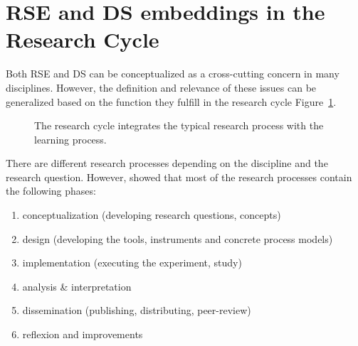 \documentclass[
        english,biblatex
    ]{lni}
\providecommand{\tightlist}{%
    \setlength{\itemsep}{0pt}\setlength{\parskip}{0pt}}
\begin{document}
    \section{RSE and DS embeddings in the Research
    Cycle}\label{rse-and-ds-embeddings-in-the-research-cycle}

    Both RSE and DS can be conceptualized as a cross-cutting concern in
    many disciplines. However, the definition and relevance of these
    issues can be generalized based on the function they fulfill in the
    research cycle Figure~\ref{fig-research_cycle}.

    \begin{figure}


    \caption{\label{fig-research_cycle}The research cycle
    \autocite{wildt2009forschendes} integrates the typical research
    process with the learning process.}

    \end{figure}%

    There are different research processes depending on the discipline
    and the research question. However, \autocite{Dehne2021} showed that
    most of the research processes contain the following phases:

    \begin{enumerate}
    \def\labelenumi{\arabic{enumi}.}
    \tightlist
    \item
      conceptualization (developing research questions, concepts)
    \item
      design (developing the tools, instruments and concrete process
      models)
    \item
      implementation (executing the experiment, study)
    \item
      analysis \& interpretation
    \item
      dissemination (publishing, distributing, peer-review)
    \item
      reflexion and improvements
    \end{enumerate}
\end{document}
